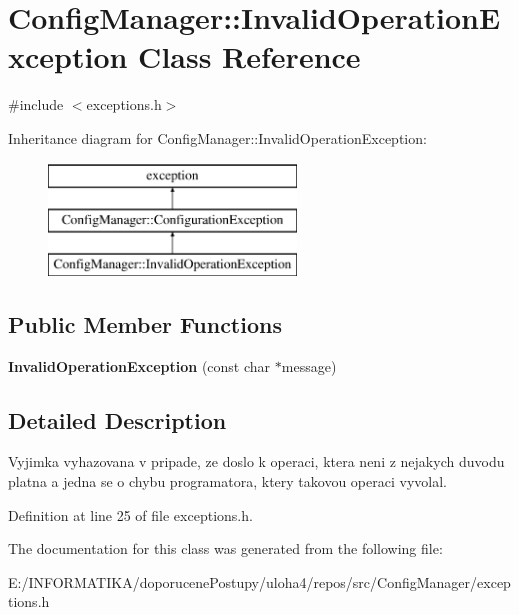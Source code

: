 \hypertarget{class_config_manager_1_1_invalid_operation_exception}{}\section{Config\+Manager\+:\+:Invalid\+Operation\+Exception Class Reference}
\label{class_config_manager_1_1_invalid_operation_exception}


{\ttfamily \#include $<$exceptions.\+h$>$}

Inheritance diagram for Config\+Manager\+:\+:Invalid\+Operation\+Exception\+:\begin{figure}[H]
\begin{center}
\leavevmode
\includegraphics[height=3.000000cm]{class_config_manager_1_1_invalid_operation_exception}
\end{center}
\end{figure}
\subsection*{Public Member Functions}
\begin{DoxyCompactItemize}
\item 
{\bfseries Invalid\+Operation\+Exception} (const char $\ast$message)\hypertarget{class_config_manager_1_1_invalid_operation_exception_aee04fbcabd25794c25f1d245fd9d5f29}{}\label{class_config_manager_1_1_invalid_operation_exception_aee04fbcabd25794c25f1d245fd9d5f29}

\end{DoxyCompactItemize}


\subsection{Detailed Description}
Vyjimka vyhazovana v pripade, ze doslo k operaci, ktera neni z nejakych duvodu platna a jedna se o chybu programatora, ktery takovou operaci vyvolal. 

Definition at line 25 of file exceptions.\+h.



The documentation for this class was generated from the following file\+:\begin{DoxyCompactItemize}
\item 
E\+:/\+I\+N\+F\+O\+R\+M\+A\+T\+I\+K\+A/doporucene\+Postupy/uloha4/repos/src/\+Config\+Manager/exceptions.\+h\end{DoxyCompactItemize}
